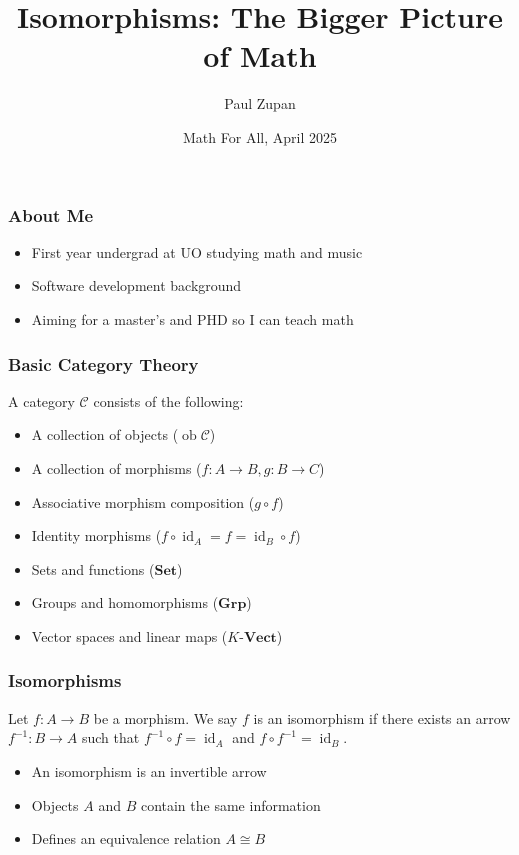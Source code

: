 \documentclass{beamer}
\title{Isomorphisms: The Bigger Picture of Math}
\author{Paul Zupan}
\institute{First Year Undergraduate \\ University of Oregon}
\date{Math For All, April 2025}
\DeclareMathOperator{\id}{id}
\DeclareMathOperator{\ob}{ob}
\begin{document}
\frame{\titlepage}

\begin{frame}
  \frametitle{About Me}

  \begin{itemize}
    \item First year undergrad at UO studying math and music
    \item Software development background
    \item Aiming for a master's and PHD so I can teach math
  \end{itemize}
\end{frame}

\begin{frame}
  \frametitle{Basic Category Theory}

  \begin{definition}
    A category \(\mathcal{C}\) consists of the following:

    \begin{itemize}
      \item A collection of objects (\(\ob{\mathcal{C}}\))
      \item A collection of morphisms (\(f : A \to B, g : B \to C\))
      \item Associative morphism composition (\(g \circ f\))
      \item Identity morphisms (\(f \circ \id_A = f = \id_B \circ f\))
    \end{itemize}
  \end{definition} \pause

  \begin{examples}
    \begin{itemize}
      \item Sets and functions (\(\mathbf{Set}\))
      \item Groups and homomorphisms (\(\mathbf{Grp}\))
      \item Vector spaces and linear maps (\(K\)-\(\mathbf{Vect}\))
    \end{itemize}
  \end{examples}
\end{frame}

\begin{frame}
  \frametitle{Isomorphisms}

  \begin{definition}
    Let \(f : A \to B\) be a morphism. We say \(f\) is an isomorphism if there
    exists an arrow \(f^{-1} : B \to A\) such that \(f^{-1} \circ f = \id_A\)
    and \(f \circ f^{-1} = \id_B\).
  \end{definition}

  \begin{itemize}
    \item An isomorphism is an invertible arrow
    \item Objects \(A\) and \(B\) contain the same information
    \item Defines an equivalence relation \(A \cong B\)
  \end{itemize}
\end{frame}
\end{document}
